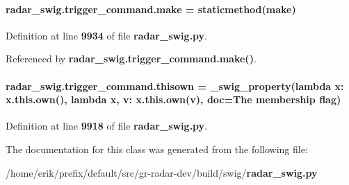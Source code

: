 \paragraph[{make}]{\setlength{\rightskip}{0pt plus 5cm}radar\+\_\+swig.\+trigger\+\_\+command.\+make = staticmethod(make)\hspace{0.3cm}{\ttfamily [static]}}\label{classradar__swig_1_1trigger__command_a5122daab70535d31ca0e554c6223daff}


Definition at line {\bf 9934} of file {\bf radar\+\_\+swig.\+py}.



Referenced by {\bf radar\+\_\+swig.\+trigger\+\_\+command.\+make()}.

\paragraph[{thisown}]{\setlength{\rightskip}{0pt plus 5cm}radar\+\_\+swig.\+trigger\+\_\+command.\+thisown = {\bf \+\_\+swig\+\_\+property}(lambda x\+: x.\+this.\+own(), lambda {\bf x}, v\+: x.\+this.\+own(v), doc=\textquotesingle{}The membership flag\textquotesingle{})\hspace{0.3cm}{\ttfamily [static]}}\label{classradar__swig_1_1trigger__command_a92b3e4a9a6bb5f7d7d585ebbead2c6b6}


Definition at line {\bf 9918} of file {\bf radar\+\_\+swig.\+py}.



The documentation for this class was generated from the following file\+:\begin{DoxyCompactItemize}
\item 
/home/erik/prefix/default/src/gr-\/radar-\/dev/build/swig/{\bf radar\+\_\+swig.\+py}\end{DoxyCompactItemize}

